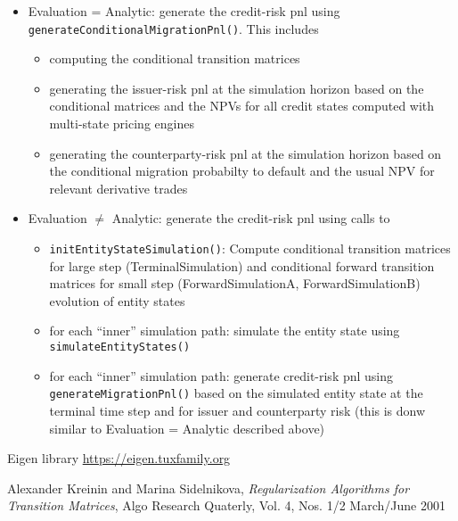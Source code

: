 \documentclass[12pt, a4paper]{article}
\begin{document}
\begin{itemize}
\item Evaluation = Analytic: generate the credit-risk pnl using \verb+generateConditionalMigrationPnl()+. This includes
  \begin{itemize}
  \item computing the conditional transition matrices
  \item generating the issuer-risk pnl at the simulation horizon based on the conditional matrices and the NPVs for all
    credit states computed with multi-state pricing engines
  \item generating the counterparty-risk pnl at the simulation horizon based on the conditional migration probabilty to
    default and the usual NPV for relevant derivative trades
  \end{itemize}
\item Evaluation $\neq$ Analytic: generate the credit-risk pnl using calls to
  \begin{itemize}
  \item \verb+initEntityStateSimulation()+: Compute conditional transition matrices for large step (TerminalSimulation) and
    conditional forward transition matrices for small step (ForwardSimulationA, ForwardSimulationB) evolution of entity states
  \item for each ``inner'' simulation path: simulate the entity state using \verb+simulateEntityStates()+
  \item for each ``inner'' simulation path: generate credit-risk pnl using \verb+generateMigrationPnl()+ based on the
    simulated entity state at the terminal time step and for issuer and counterparty risk (this is donw similar to
    Evaluation = Analytic described above)
  \end{itemize}
\end{itemize}

\begin{thebibliography}{*}

 Eigen library \url{https://eigen.tuxfamily.org}
  
 Alexander Kreinin and Marina Sidelnikova, {\em Regularization Algorithms for Transition Matrices}, Algo Research Quaterly, Vol. 4, Nos. 1/2 March/June 2001

\end{thebibliography}
\end{document}
